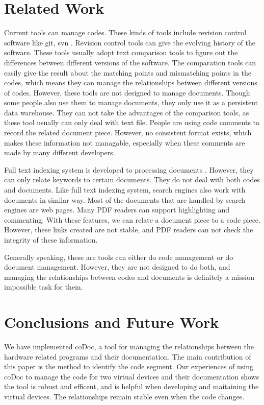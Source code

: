\documentclass[conference]{IEEEtran}
\begin{document}
\section{Related Work}
\label{sec:related}
Current tools can manage codes. 
These kinds of tools include revision control software like git, svn \cite{git} \cite{svn}. 
Revision control tools can give the evolving history of the software.
These tools usually adopt text comparison tools to figure out the differences between different versions of the software.
The comparation tools can easily give the result about the matching points and mismatching points in the codes,
which means they can manage the relationships between different versions of codes.
However, these tools are not designed to manage documents.
Though some people also use them to manage documents,
they only use it as a persistent data warehouse.
They can not take the advantages of the comparison tools, 
as these tool usually can only deal with text file.
People are using code comments to record the related document piece.
However, no consistent format exists,
which makes these information not managable,
especially when these comments are made by many different developers.

Full text indexing system is developed to processing documents \cite{lucene}.
However, they can only relate keywords to certain documents.
They do not deal with both codes and documents. 
Like full text indexing system,
search engines also work with documents in similar way.
Most of the documents that are handled by search engines are web pages.
Many PDF readers can support highlighting and commenting.
With these features, we can relate a document piece to a code piece.
However, these links created are not stable,
and PDF readers can not check the integrity of these information.

Generally speaking, these are tools can either do code management or do document management.
However, they are not designed to do both,
and managing the relationships between codes and documents is definitely a mission impossible task for them.


\section{Conclusions and Future Work}
\label{sec:conclusion}
We have implemented coDoc, 
a tool for managing the relationships between the hardware related programs and their documentation.
The main contribution of this paper is the method to identify the code segment.
Our experiences of using coDoc to manage the code for two virtual devices and their documentation shows the tool is robust and efficent,
and is helpful when developing and maitaining the virtual devices.
The relationships remain stable even when the code changes.
\end{document}
